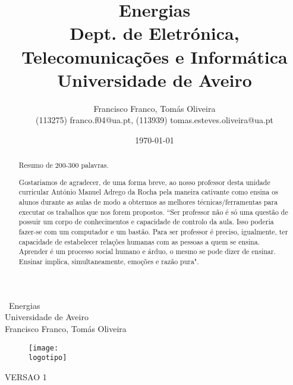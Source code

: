 \documentclass{report}
\begin{document}
%

\def\titulo{Energias}
\def\data{DATA}
\def\autores{Francisco Franco, Tomás Oliveira}
\def\autorescontactos{(113275) franco.f04@ua.pt, (113939) tomas.esteves.oliveira@ua.pt}
\def\versao{VERSAO 1}
\def\departamento{Dept. de Eletrónica, Telecomunicações e Informática}
\def\empresa{Universidade de Aveiro}
\def\logotipo{ua.pdf}
%
%
\begin{titlepage}

\begin{center}
%
\vspace*{50mm}
%
{\Huge \ Energias}\\ 
%
\vspace{10mm}
%
{\Large \empresa}\\
%
\vspace{10mm}
%
{\LARGE \autores}\\ 
%
\vspace{30mm}
%
\begin{figure}[h]
\center
\texttt{[image: \\logotipo]}
\end{figure}
%
\vspace{30mm}
\end{center}
%
\begin{flushright}
\versao
\end{flushright}
\end{titlepage}

\title{%
{\Huge\textbf{\titulo}}\\
{\Large \departamento\\ \empresa}
}
%
\author{%
    \autores \\
    \autorescontactos
}
%
\date{\today}
%
\maketitle


\begin{abstract}
Resumo de 200-300 palavras.
\end{abstract}

\renewcommand{\abstractname}{Agradecimentos}
\begin{abstract}
Gostariamos de agradecer, de uma forma breve, ao nosso professor desta unidade curricular António Manuel Adrego da Rocha pela maneira cativante como ensina os alunos durante as aulas de modo a obtermos as melhores técnicas/ferramentas para executar os trabalhos que nos forem propostos.
“Ser professor não é só uma questão de possuir um corpo de
conhecimentos e capacidade de controlo da aula. Isso
poderia fazer-se com um computador e um bastão. Para ser
professor é preciso, igualmente, ter capacidade de
estabelecer relações humanas com as pessoas a quem se
ensina. Aprender é um processo social humano e árduo, o
mesmo se pode dizer de ensinar. Ensinar implica,
simultaneamente, emoções e razão pura". 
\end{abstract}
\end{document}
